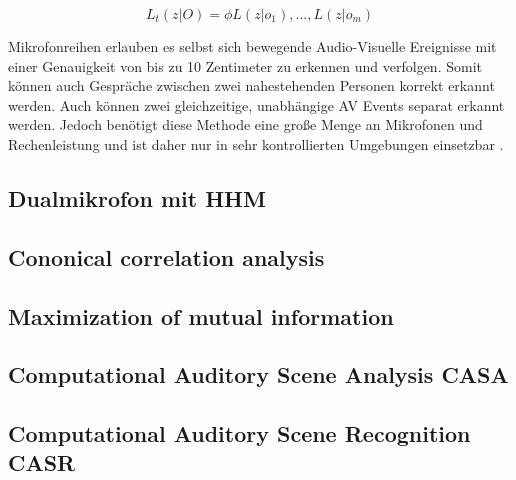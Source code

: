 \begin{equation}
L_t(z|O) = \phi L(z|o_1), ..., L(z|o_m)
\end{equation}

\bigskip

Mikrofonreihen erlauben es selbst sich bewegende Audio-Visuelle Ereignisse mit einer Genauigkeit von bis zu 10 Zentimeter zu erkennen und verfolgen. Somit können auch Gespräche zwischen zwei nahestehenden Personen korrekt erkannt werden. Auch können zwei gleichzeitige, unabhängige AV Events separat erkannt werden. Jedoch benötigt diese Methode eine große Menge an Mikrofonen und Rechenleistung und ist daher nur in sehr kontrollierten Umgebungen einsetzbar \cite{Che02}.

\subsection{Dualmikrofon mit HHM}

\subsection{Cononical correlation analysis}

\subsection{Maximization of mutual information}

\subsection{Computational Auditory Scene Analysis CASA}
\subsection{Computational Auditory Scene Recognition CASR}
